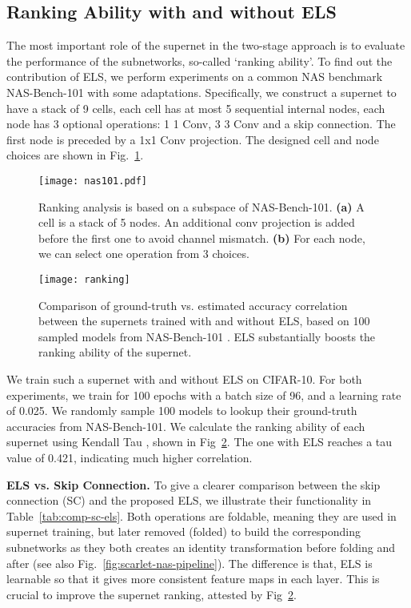 \documentclass[10pt,twocolumn,letterpaper]{article}
\theoremstyle{definition}
\begin{document}
\subsection{Ranking Ability with and without ELS}

The most important role of the supernet in the two-stage approach is to evaluate the performance of the subnetworks, so-called  `ranking ability'. To find out the contribution of ELS, we perform experiments on a common NAS benchmark NAS-Bench-101 \cite{ying2019bench} with some adaptations. Specifically, we construct a supernet to have a stack of 9 cells, each cell has at most 5 sequential internal nodes, each node has 3 optional operations: 1  1 Conv, 3  3 Conv and a skip connection. The first node is preceded by a 1x1 Conv projection. The designed cell and node choices are shown in Fig.~\ref{fig:nas-101}. 

\begin{figure}
	\centering
	\texttt{[image: nas101.pdf]}
	\caption{Ranking analysis is based on a subspace of NAS-Bench-101. \textbf{(a)} A cell is a stack of 5 nodes. An additional  conv projection is added before the first one to avoid channel mismatch. \textbf{(b)} For each node, we can select one operation from 3 choices.}
	\label{fig:nas-101}
\end{figure} 


\begin{figure}
	\centering
	\texttt{[image: ranking]}
	\caption{Comparison of ground-truth vs. estimated accuracy correlation between the supernets trained with and without ELS, based on 100 sampled models from NAS-Bench-101 \cite{ying2019bench}. ELS substantially boosts the ranking ability of the supernet.}
	\label{fig:ranking}
\end{figure} 

We train such a supernet with and without ELS on CIFAR-10. 
For both experiments, we train for 100 epochs with a batch size of 96, and a learning rate of 0.025. We randomly sample 100 models to lookup their ground-truth accuracies from NAS-Bench-101. We calculate the ranking ability of each supernet using Kendall Tau \cite{kendall1938new}, shown in Fig~\ref{fig:ranking}. The one with ELS reaches a  tau value of 0.421, indicating much higher correlation.










\textbf{ELS vs. Skip Connection.} To give a clearer comparison between the skip connection (SC) and the proposed ELS, we illustrate their functionality in Table~\ref{tab:comp-sc-els}. Both operations are foldable, meaning they are used in supernet training, but later removed (folded) to build the corresponding subnetworks as they both creates an identity transformation before folding and after (see also Fig.~\ref{fig:scarlet-nas-pipeline}). The difference is that, ELS is learnable so that it gives more consistent feature maps in each layer. This is crucial to improve the supernet ranking, attested by Fig~\ref{fig:ranking}.
\end{document}
